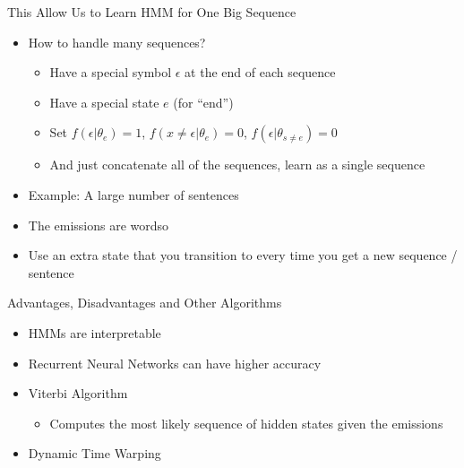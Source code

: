 \documentclass[aspectratio=169]{beamer}
\begin{document}

\begin{frame}{This Allow Us to Learn HMM for One Big Sequence}

\begin{itemize}
\item How to handle many sequences?
\begin{itemize}
\item Have a special symbol $\epsilon$ at the end of each sequence
\item Have a special state $e$ (for ``end'')
\item Set $f(\epsilon|\theta_e) = 1$, $f(x \neq \epsilon|\theta_e) = 0$,  $f(\epsilon|\theta_{s\neq e}) = 0$
\item And just concatenate all of the sequences, learn as a single sequence
\end{itemize}
\item Example: A large number of sentences
\item The emissions are wordso
\item Use an extra state that you transition to every time you get a new sequence / sentence
\end{itemize}
\end{frame}

\begin{frame}{Advantages, Disadvantages and Other Algorithms}

\begin{itemize}
\item HMMs are interpretable
\item Recurrent Neural Networks can have higher accuracy
\vspace{1em}
\item Viterbi Algorithm
\begin{itemize}
\item Computes the most likely sequence of hidden states given the emissions
\end{itemize}
\item Dynamic Time Warping
\end{itemize}
\end{frame}

\end{document}
